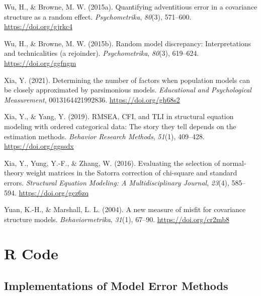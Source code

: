\documentclass[11pt]{umnthesis}
\newlength{\cslhangindent}
\newenvironment{CSLReferences}[2] %
 {%
  \setlength{\parindent}{0pt}
  \ifodd #1 \everypar{\setlength{\hangindent}{\cslhangindent}}\ignorespaces\fi
  \ifnum #2 > 0
  \setlength{\parskip}{#2\baselineskip}
  \fi
 }%
 {}
\begin{document}
\begin{CSLReferences}{1}{0}
\leavevmode{}%
Wu, H., \& Browne, M. W. (2015a). Quantifying adventitious error in a covariance structure as a random effect. \emph{Psychometrika}, \emph{80}(3), 571--600. \url{https://doi.org/gjrkc4}

\leavevmode{}%
Wu, H., \& Browne, M. W. (2015b). Random model discrepancy: {Interpretations} and technicalities (a rejoinder). \emph{Psychometrika}, \emph{80}(3), 619--624. \url{https://doi.org/ggfngm}

\leavevmode{}%
Xia, Y. (2021). Determining the number of factors when population models can be closely approximated by parsimonious models. \emph{Educational and Psychological Measurement}, 0013164421992836. \url{https://doi.org/gh68s2}

\leavevmode{}%
Xia, Y., \& Yang, Y. (2019). {RMSEA}, {CFI}, and {TLI} in structural equation modeling with ordered categorical data: {The} story they tell depends on the estimation methods. \emph{Behavior Research Methods}, \emph{51}(1), 409--428. \url{https://doi.org/ggssdx}

\leavevmode{}%
Xia, Y., Yung, Y.-F., \& Zhang, W. (2016). Evaluating the selection of normal-theory weight matrices in the {Satorra} correction of chi-square and standard errors. \emph{Structural Equation Modeling: A Multidisciplinary Journal}, \emph{23}(4), 585--594. \url{https://doi.org/gcz6zq}

\leavevmode{}%
Yuan, K.-H., \& Marshall, L. L. (2004). A new measure of misfit for covariance structure models. \emph{Behaviormetrika}, \emph{31}(1), 67--90. \url{https://doi.org/cr2mb8}

\end{CSLReferences}

\setlength{\parindent}{0.20in}
\setlength{\leftskip}{0pt}

\hypertarget{appendix-appendix}{%
\appendix}


\hypertarget{appendix-a}{%
\chapter{R Code}\label{appendix-a}}


\hypertarget{implementations-of-model-error-methods}{%
\section{Implementations of Model Error Methods}\label{implementations-of-model-error-methods}}
\end{document}
